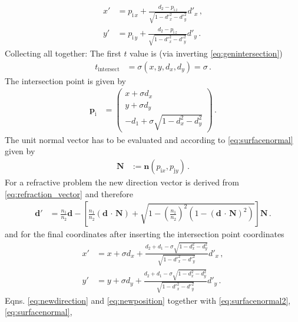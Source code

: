 \documentclass[12pt,a4paper,twoside,openright,BCOR10mm,headsepline,titlepage,abstracton,chapterprefix,final]{scrreprt}
\newcommand\Vector[1]{{\mathbf{#1}}}
\newcommand{\scpm}[2]{(#1\,\cdot\,#2)}
\begin{document}
\begin{subequations}
\begin{align}
 x' &= p_{\text{i}\,x} + \frac{d_2 - p_{\text{i}\,z}}{\sqrt{1 - {d'}_x^2 - {d'}_y^2}} {d'}_x\,,\\
 y' &= p_{\text{i}\,y} + \frac{d_2 - p_{\text{i}\,z}}{\sqrt{1 - {d'}_x^2 - {d'}_y^2}} {d'}_y\,.
\end{align}
\end{subequations}
Collecting all together: The first $t$ value is (via inverting \eqref{eq:genintersection})
\begin{align}
 t_\text{intersect} &= \sigma(x, y, d_x, d_y) = \sigma\,.\label{eq:sigmasol}
\end{align}
The intersection point is given by
\begin{align}
 \Vector{p}_\text{i} &= \begin{pmatrix} x + \sigma d_x \\ y + \sigma d_y \\ -d_1 + \sigma \sqrt{1 - d_x^2 - d_y^2} \end{pmatrix}\,.
\end{align}
The unit normal vector has to be evaluated and according to \eqref{eq:surfacenormal} given by
\begin{align}
 \Vector{N} &:= \Vector{n}(p_{\text{i}x}, p_{\text{j}y})\,.\label{eq:surfacenormal2}
\end{align}
For a refractive problem the new direction vector is derived from \eqref{eq:refraction_vector} and therefore
\begin{align}
 \Vector{d}' &= \frac{n_1}{n_2} \Vector{d} 
 - \left[\frac{n_1}{n_2} \scpm{\Vector{d}}{\Vector{N}} 
      + \sqrt{1 - \left(\frac{n_1}{n_2}\right)^2 (1 - {\scpm{\Vector{d}}{\Vector{N}}}^2)}\right] \Vector{N}\,.\label{eq:newdirection}
\end{align}
and for the final coordinates after inserting the intersection point coordinates
\begin{subequations}
\label{eq:newposition}
\begin{align}
 x' &= x + \sigma d_x + \frac{d_2 + d_1 - \sigma \sqrt{1 - d_x^2 - d_y^2}}{\sqrt{1 - {d'}_x^2 - {d'}_y^2}} {d'}_x\,,\\
 y' &= y + \sigma d_y + \frac{d_2 + d_1 - \sigma \sqrt{1 - d_x^2 - d_y^2}}{\sqrt{1 - {d'}_x^2 - {d'}_y^2}} {d'}_y\,.
\end{align}
\end{subequations}
Eqns. \eqref{eq:newdirection} and \eqref{eq:newposition} together with \eqref{eq:surfacenormal2}, \eqref{eq:surfacenormal},
\end{document}
